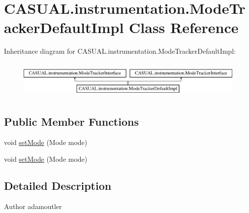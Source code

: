 \hypertarget{class_c_a_s_u_a_l_1_1instrumentation_1_1_mode_tracker_default_impl}{\section{C\-A\-S\-U\-A\-L.\-instrumentation.\-Mode\-Tracker\-Default\-Impl Class Reference}
\label{class_c_a_s_u_a_l_1_1instrumentation_1_1_mode_tracker_default_impl}
}
Inheritance diagram for C\-A\-S\-U\-A\-L.\-instrumentation.\-Mode\-Tracker\-Default\-Impl\-:\begin{figure}[H]
\begin{center}
\leavevmode
\includegraphics[height=1.866667cm]{class_c_a_s_u_a_l_1_1instrumentation_1_1_mode_tracker_default_impl}
\end{center}
\end{figure}
\subsection*{Public Member Functions}
\begin{DoxyCompactItemize}
\item 
void \hyperlink{class_c_a_s_u_a_l_1_1instrumentation_1_1_mode_tracker_default_impl_a319167f59f2d859a2b78cc9ee5554597}{set\-Mode} (Mode mode)
\item 
void \hyperlink{class_c_a_s_u_a_l_1_1instrumentation_1_1_mode_tracker_default_impl_a319167f59f2d859a2b78cc9ee5554597}{set\-Mode} (Mode mode)
\end{DoxyCompactItemize}


\subsection{Detailed Description}
\begin{DoxyAuthor}{Author}
adamoutler 
\end{DoxyAuthor}


